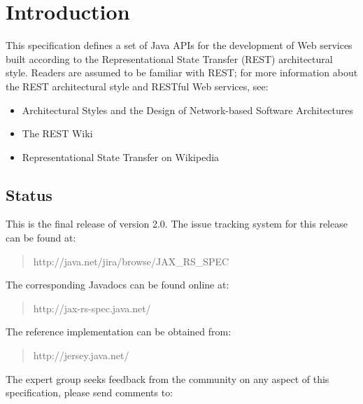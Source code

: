 \chapter{Introduction}

This specification defines a set of Java APIs for the development of Web services built according to the Representational State Transfer\cite{rest} (REST) architectural style. Readers are assumed to be familiar with 
REST; for more information about the REST architectural style and RESTful Web services, see:

\begin{itemize}
\item Architectural Styles and the Design of Network-based Software Architectures\cite{rest}
\item The REST Wiki\cite{restwiki}
\item Representational State Transfer on Wikipedia\cite{restwikipedia}
\end{itemize}

\section{Status}
\label{status}


This is the final release of version 2.0. The issue tracking system for this release can be found at:

\begin{quote}
http://java.net/jira/browse/JAX\_RS\_SPEC
\end{quote}

The corresponding Javadocs can be found online at:

\begin{quote}
http://jax-rs-spec.java.net/
\end{quote}

The reference implementation can be obtained from:

\begin{quote}
http://jersey.java.net/
\end{quote}

The expert group seeks feedback from the community on any aspect of this specification, please send comments to:

